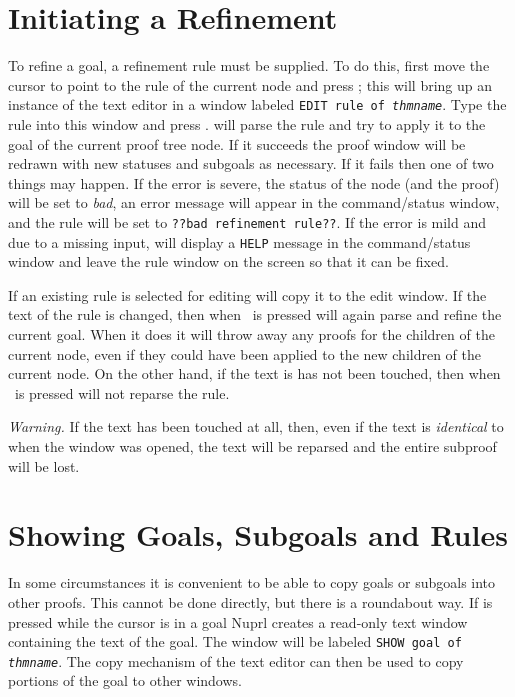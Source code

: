 \section{Initiating a Refinement}

To refine a goal, a refinement rule must be supplied.
To do this, first move the cursor to point to the rule of the current node
and press \SEL{};
this will bring up an instance of the text editor in a window labeled
{\tt EDIT rule of {\it thmname}}.
Type the rule into this window and press \EXIT.
\prl{} will parse the rule and try to apply it to the goal of the current proof
tree node.
If it succeeds the proof window will be redrawn with new statuses and
subgoals as necessary.
If it fails then one of two things may happen.
If the error is severe, the status of the node (and the proof) will be set to
{\em bad}, an error message will appear in the command/status window,
and the rule will be set to {\tt ??bad refinement rule??}.
If the error is mild and due to a missing input,
\prl{} will display a {\tt HELP} message in the command/status window
and leave the rule window on the screen so that it can be fixed.

If an existing rule is selected for editing \prl{} will copy it to the
edit window.  If the text of the rule is changed, then when \EXIT\ is
pressed \prl{} will again parse and refine the current goal.  When it
does it will throw away any proofs for the children of the current
node, even if they could have been applied to the new children of the
current node.  On the other hand, if the text is has not been touched,
then when \EXIT\ is pressed \prl{} will not reparse the rule.

{\em Warning.} If the text has been touched at all, then, even if the
text is {\em identical} to when the window was opened, the text will be
reparsed and the entire subproof will be lost.

\section{Showing Goals, Subgoals and Rules}

{}In some circumstances it is convenient to be able to
copy goals or subgoals into other proofs.
This cannot be done directly, but there is a roundabout way.
If \SEL{} is pressed while the cursor is in a goal Nuprl creates a read-only
text window containing the text of the goal.
The window will be labeled {\tt SHOW goal of {\it thmname}}.
The copy mechanism of the text editor can then be used to copy
portions of the goal to other windows.


